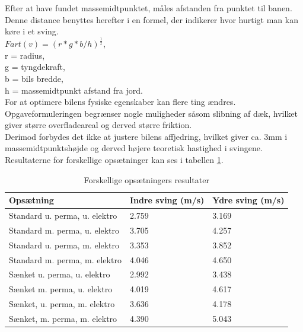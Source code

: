 Efter at have fundet massemidtpunktet, måles afstanden fra punktet til banen. Denne distance benyttes herefter i en formel, der indikerer hvor hurtigt man kan køre i et sving.  \\

\( Fart(v) = (r*g*b/h)^\frac{1}{2} \), \\
r = radius,\\
g = tyngdekraft, \\
b = bils bredde, \\
h = massemidtpunkt afstand fra jord. \\

For at optimere bilens fysiske egenskaber kan flere ting ændres. Opgaveformuleringen begrænser nogle muligheder såsom slibning af dæk, hvilket giver større overfladeareal og derved større friktion. \\

Derimod forbydes det ikke at justere bilens affjedring, hvilket giver ca. 3mm i massemidtpunktshøjde og derved højere teoretisk hastighed i svingene. Resultaterne for forskellige opsætninger kan ses i tabellen \ref{forskel_opsaat_result}. \\

\begin{table}[H]
\centering
\begin{tabular}{|l|l|l|}
\hline
Opsætning                      & Indre sving (m/s) & Ydre sving (m/s) \\ \hline
Standard u. perma,  u. elektro & 2.759             & 3.169            \\ \hline
Standard m. perma, u. elektro  & 3.705             & 4.257            \\ \hline
Standard u. perma, m. elektro  & 3.353             & 3.852            \\ \hline
Standard m. perma, m. elektro  & 4.046             & 4.650            \\ \hline
Sænket u. perma, u. elektro    & 2.992             & 3.438            \\ \hline
Sænket m. perma, u. elektro    & 4.019             & 4.617            \\ \hline
Sænket, u. perma, m. elektro   & 3.636             & 4.178            \\ \hline
Sænket, m. perma, m. elektro   & 4.390             & 5.043            \\ \hline
\end{tabular}
\caption{Forskellige opsætningers resultater}
\label{forskel_opsaat_result}
\end{table} 

